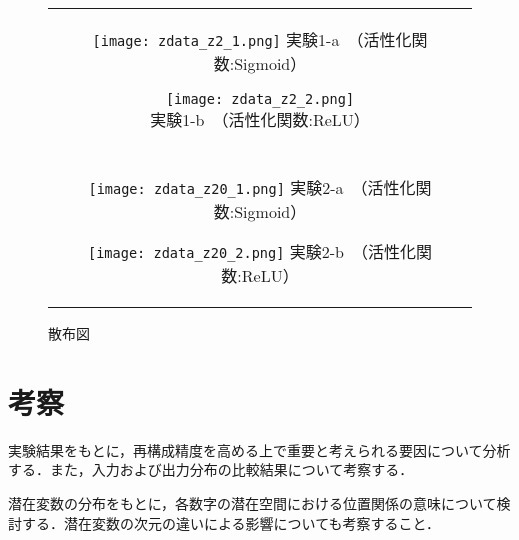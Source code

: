 \documentclass[12pt]{jsarticle}
\begin{document}
\begin{figure}[ht]
  \begin{center}
    \begin{tabular}{c}

      \begin{minipage}{0.5\hsize}
        \begin{center}
        \texttt{[image: zdata\_z2\_1.png]}
        \hspace{0.2cm} 実験1-a　（活性化関数:Sigmoid）
        \end{center}
      \end{minipage}

      \begin{minipage}{0.5\hsize}
        \begin{center}
        \texttt{[image: zdata\_z2\_2.png]}
        \hspace{0.2cm} 実験1-b　（活性化関数:ReLU）
        \end{center}
      \end{minipage}\\\\


      \begin{minipage}{0.5\hsize}
        \begin{center}
          \texttt{[image: zdata\_z20\_1.png]}
          \hspace{0.2cm} 実験2-a　（活性化関数:Sigmoid）
        \end{center}
      \end{minipage}

      \begin{minipage}{0.5\hsize}
        \begin{center}
          \texttt{[image: zdata\_z20\_2.png]}
          \hspace{0.2cm} 実験2-b　（活性化関数:ReLU）
        \end{center}
      \end{minipage}

    \end{tabular}
    \caption{散布図}
     \label{fig:sannpu2}
  \end{center}
\end{figure}





\section{考察}

実験結果をもとに，再構成精度を高める上で重要と考えられる要因について分析する．また，入力および出力分布の比較結果について考察する．

潜在変数の分布をもとに，各数字の潜在空間における位置関係の意味について検討する．潜在変数の次元の違いによる影響についても考察すること．
\end{document}
